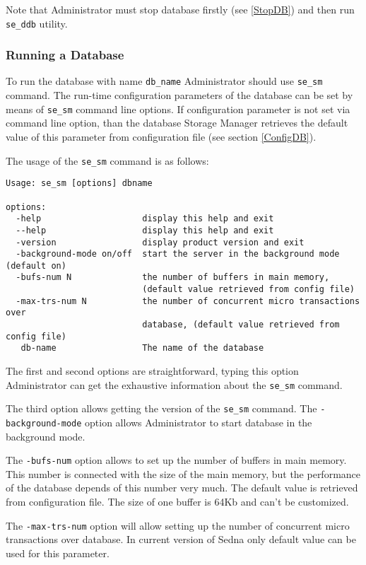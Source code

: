 \documentclass[a4paper,12pt]{article}
\begin{document}
Note that Administrator must stop database firstly (see \ref{StopDB}) and then run \verb!se_ddb! utility. 

\subsubsection{Running a Database}
\label{RunDB}

To run the database with name \verb!db_name! Administrator should use \verb!se_sm! command. The run-time configuration parameters of the database can be set by means of \verb!se_sm! command line options. If configuration parameter is not set via command line option, than the database Storage Manager retrieves the default value of this parameter from configuration file (see section \ref{ConfigDB}).

The usage of the \verb!se_sm! command is as follows:

\begin{verbatim}
Usage: se_sm [options] dbname

options:
  -help                    display this help and exit
  --help                   display this help and exit
  -version                 display product version and exit
  -background-mode on/off  start the server in the background mode (default on)
  -bufs-num N              the number of buffers in main memory,
                           (default value retrieved from config file)
  -max-trs-num N           the number of concurrent micro transactions over
                           database, (default value retrieved from config file)
   db-name                 The name of the database
\end{verbatim}


The first and second options are straightforward, typing this option Administrator can get the exhaustive information about the \verb!se_sm! command.

The third option allows getting the version of the \verb!se_sm! command.
The \verb!-background-mode! option allows Administrator to start database in the background mode.

The \verb!-bufs-num! option allows to set up the number of buffers in main memory. This number is connected with the size of the main memory, but the performance of the database depends of this number very much. The default value is retrieved from configuration file. The size of one buffer is 64Kb and can't be customized.


The \verb!-max-trs-num! option will allow setting up the number of concurrent micro transactions over database. In current version of Sedna only default value can be used for this parameter.
\end{document}
